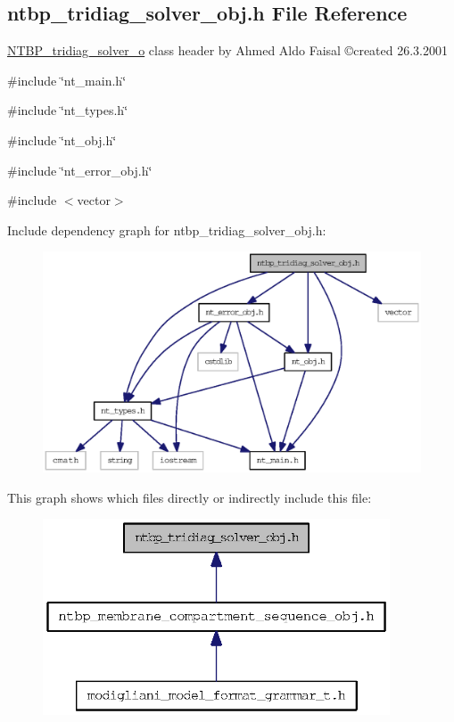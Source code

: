 \subsection{ntbp\_\-tridiag\_\-solver\_\-obj.h File Reference}
\label{ntbp__tridiag__solver__obj_8h}



\begin{DoxyItemize}
\item \hyperlink{class_n_t_b_p__tridiag__solver__o}{NTBP\_\-tridiag\_\-solver\_\-o} class header by Ahmed Aldo Faisal \copyright created 26.3.2001 
\end{DoxyItemize} 


{\ttfamily \#include \char`\"{}nt\_\-main.h\char`\"{}}\par
{\ttfamily \#include \char`\"{}nt\_\-types.h\char`\"{}}\par
{\ttfamily \#include \char`\"{}nt\_\-obj.h\char`\"{}}\par
{\ttfamily \#include \char`\"{}nt\_\-error\_\-obj.h\char`\"{}}\par
{\ttfamily \#include $<$vector$>$}\par
Include dependency graph for ntbp\_\-tridiag\_\-solver\_\-obj.h:
\nopagebreak
\begin{figure}[H]
\begin{center}
\leavevmode
\includegraphics[width=400pt]{ntbp__tridiag__solver__obj_8h__incl}
\end{center}
\end{figure}
This graph shows which files directly or indirectly include this file:
\nopagebreak
\begin{figure}[H]
\begin{center}
\leavevmode
\includegraphics[width=292pt]{ntbp__tridiag__solver__obj_8h__dep__incl}
\end{center}
\end{figure}
